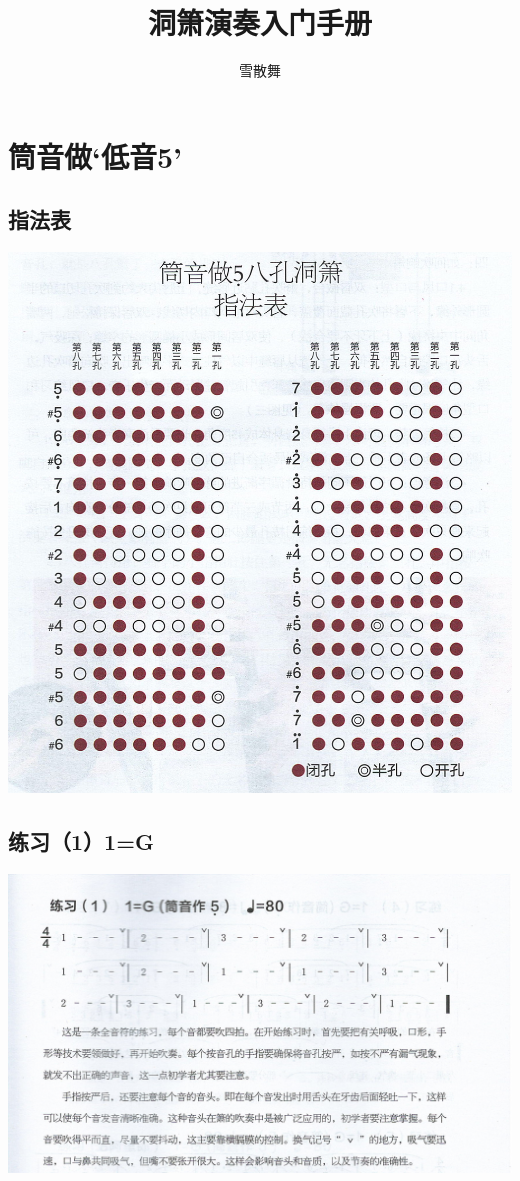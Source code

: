 \documentclass[cn,pad,chinese,chinesefont=nofont]{elegantbook}
\title{洞箫演奏入门手册}
\author{雪散舞}
\date{\gitcommitdate}
\begin{document}
\maketitle
\frontmatter
\tableofcontents
\mainmatter

\centering
\chapter{筒音做‘低音5’}
\section{指法表}
\includegraphics[width=\textwidth]{dongxiao/Scan.jpeg}

\section{练习（1）1=G}
\includegraphics[width=\textwidth]{dongxiao/Scan 1-1.jpeg}
\end{document}
